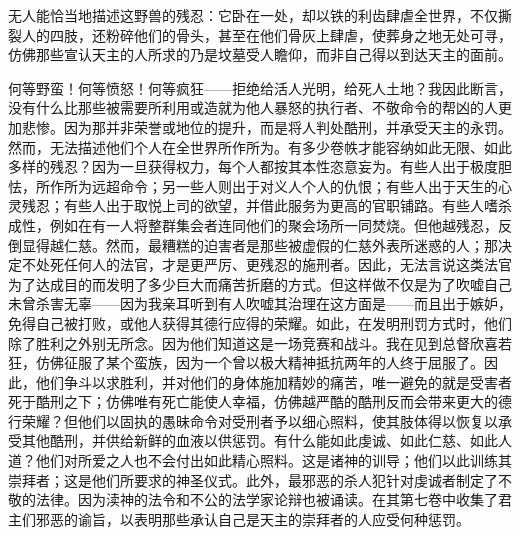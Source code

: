 \newline{} \par

无人能恰当地描述这野兽的残忍：它卧在一处，却以铁的利齿肆虐全世界，不仅撕裂人的四肢，还粉碎他们的骨头，甚至在他们骨灰上肆虐，使葬身之地无处可寻，仿佛那些宣认天主的人所求的乃是坟墓受人瞻仰，而非自己得以到达天主的面前。\par

何等野蛮！何等愤怒！何等疯狂——拒绝给活人光明，给死人土地？\newline{}我因此断言，没有什么比那些被需要所利用或造就为他人暴怒的执行者、不敬命令的帮凶的人更加悲惨。因为那并非荣誉或地位的提升，而是将人判处酷刑，并承受天主的永罚。\newline{}然而，无法描述他们个人在全世界所作所为。有多少卷帙才能容纳如此无限、如此多样的残忍？因为一旦获得权力，每个人都按其本性恣意妄为。有些人出于极度胆怯，所作所为远超命令；另一些人则出于对义人个人的仇恨；有些人出于天生的心灵残忍；有些人出于取悦上司的欲望，并借此服务为更高的官职铺路。有些人嗜杀成性，例如在有一人将整群集会者连同他们的聚会场所一同焚烧。但他越残忍，反倒显得越仁慈。\newline{}然而，最糟糕的迫害者是那些被虚假的仁慈外表所迷惑的人；那决定不处死任何人的法官，才是更严厉、更残忍的施刑者。因此，无法言说这类法官为了达成目的而发明了多少巨大而痛苦折磨的方式。\newline{}但这样做不仅是为了吹嘘自己未曾杀害无辜——因为我亲耳听到有人吹嘘其治理在这方面是——而且出于嫉妒，免得自己被打败，或他人获得其德行应得的荣耀。如此，在发明刑罚方式时，他们除了胜利之外别无所念。因为他们知道这是一场竞赛和战斗。我在见到总督欣喜若狂，仿佛征服了某个蛮族，因为一个曾以极大精神抵抗两年的人终于屈服了。\newline{}因此，他们争斗以求胜利，并对他们的身体施加精妙的痛苦，唯一避免的就是受害者死于酷刑之下；仿佛唯有死亡能使人幸福，仿佛越严酷的酷刑反而会带来更大的德行荣耀？但他们以固执的愚昧命令对受刑者予以细心照料，使其肢体得以恢复以承受其他酷刑，并供给新鲜的血液以供惩罚。有什么能如此虔诚、如此仁慈、如此人道？他们对所爱之人也不会付出如此精心照料。这是诸神的训导；他们以此训练其崇拜者；这是他们所要求的神圣仪式。\newline{}此外，最邪恶的杀人犯针对虔诚者制定了不敬的法律。因为渎神的法令和不公的法学家论辩也被诵读。在其第七卷中收集了君主们邪恶的谕旨，以表明那些承认自己是天主的崇拜者的人应受何种惩罚。\par

